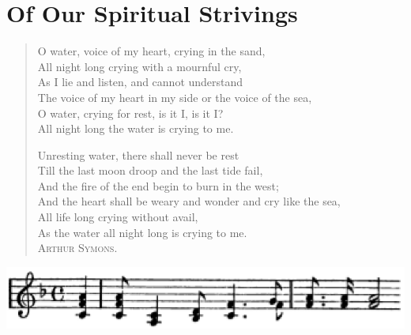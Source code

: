 
\author{W. E. B. Du Bois}
\chapter{Of Our Spiritual Strivings}


\begin{verse}
O water, voice of my heart, crying in the sand,\\
\hspace{1.1em} All night long crying with a mournful cry,\\
As I lie and listen, and cannot understand\\
\hspace{2.2em} The voice of my heart in my side or the voice of the
sea,\\
\hspace{1.1em} O water, crying for rest, is it I, is it I?\\
\hspace{2.2em} All night long the water is crying to me.

Unresting water, there shall never be rest\\
\hspace{1.1em} Till the last moon droop and the last tide fail,\\
And the fire of the end begin to burn in the west;\\
\hspace{2.2em} And the heart shall be weary and wonder and cry like
the sea,\\
\hspace{1.1em} All life long crying without avail,\\
\hspace{2.2em} As the water all night long is crying to me.\\
\hfill\textsc{Arthur Symons}.
\end{verse}

\begin{center}
\includegraphics{texts/music.eps}
\end{center}

